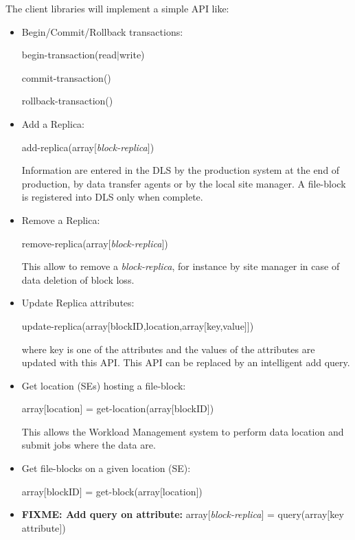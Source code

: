 \documentclass[pdftex]{cmspaper}
\begin{document}
The client libraries will implement a simple API like:
\begin{itemize}
\item Begin/Commit/Rollback transactions:

       begin-transaction(read$|$write)

       commit-transaction()

       rollback-transaction()

\item Add a Replica:  

    add-replica(array$[${\em block-replica}$]$)
    
     Information are entered in the DLS by the production system at 
     the end of production, by data transfer agents or by the local 
     site manager. A file-block is registered into DLS only when complete.

\item Remove a Replica:
  
      remove-replica(array$[${\em block-replica}$]$)

      This allow to remove a {\em block-replica}, for instance by site 
      manager in case of data deletion of block loss.

\item Update Replica attributes:

      update-replica(array$[$blockID,location,array$[$key,value$]$$]$)

      where key is one of the attributes and the values of the attributes are updated
      with this API. This API can be replaced by an intelligent add query.

\item Get location (SEs) hosting a file-block:  

      array$[$location$]$ = get-location(array$[$blockID$]$)

      This allows the Workload Management system to perform data location
      and submit jobs where the data are.

\item Get file-blocks on a given location (SE):

      array$[$blockID$]$ = get-block(array$[$location$]$)


\item {\bf FIXME: Add query on attribute:}  array$[${\em block-replica}$]$ = query(array$[$key attribute$]$)
 

\end{itemize}
\end{document}
